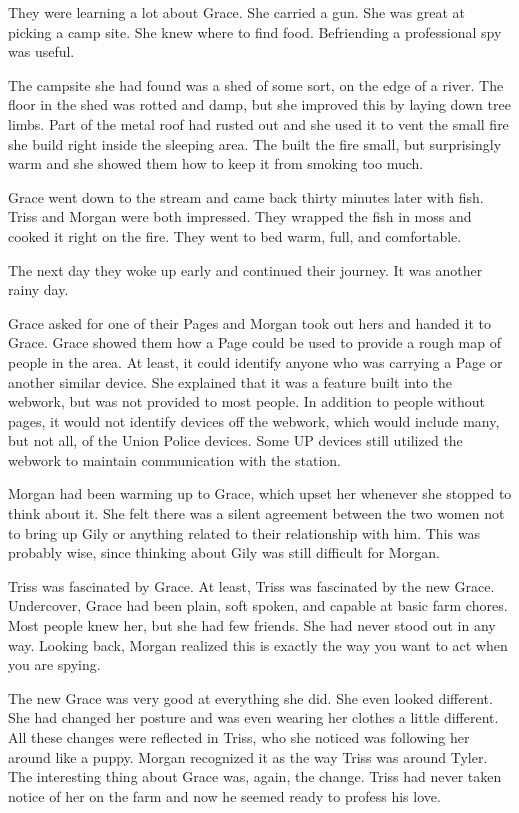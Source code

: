 \documentclass[courier]{sffms}
\begin{document}
They were learning a lot about Grace. She carried
a gun. She was great at picking a camp site. She knew
where to find food. Befriending a professional
spy was useful.

The campsite she had found was a shed of some sort,
on the edge of a river. The floor in the shed was rotted
and damp, but she improved this by laying down
tree limbs. Part of the metal roof had rusted out and
she used it to vent the small fire she build right inside
the sleeping area. The built the fire small, but surprisingly
warm and she showed them how to keep it from smoking
too much.

Grace went down to the stream and came back thirty
minutes later with fish. Triss and Morgan were both
impressed. They wrapped the fish in moss and cooked
it right on the fire. They went to bed warm, full, and
comfortable.

The next day they woke up early and continued their
journey. It was another rainy day.

Grace asked for one of their Pages and Morgan took
out hers and handed it to Grace. Grace showed them
how a Page could be used to provide a rough map of
people in the area. At least, it could identify anyone
who was carrying a Page or another similar device.
She explained that it was a feature built into the
webwork, but was not provided to most people. In
addition to people without pages, it would not identify
devices off the webwork, which would include many,
but not all, of the Union Police devices. Some UP devices
still utilized the webwork to maintain communication
with the station.

Morgan had been warming up to Grace, which upset
her whenever she stopped to think about it. She felt
there was a silent agreement between the two women
not to bring up Gily or anything related to their relationship
with him. This was probably wise, since thinking about
Gily was still difficult for Morgan.

Triss was fascinated by Grace. At least, Triss was
fascinated by the new Grace. Undercover, Grace had
been plain, soft spoken, and capable at basic farm
chores. Most people knew her, but she had few friends.
She had never stood out in any way. Looking back,
Morgan realized this is exactly the way you want to
act when you are spying.

The new Grace was very good at everything she did.
She even looked different. She had changed her posture
and was even wearing her clothes a little different.
All these changes were reflected in Triss, who she
noticed was following her around like a puppy. Morgan
recognized it as the way Triss was around Tyler. The
interesting thing about Grace was, again, the change.
Triss had never taken notice of her on the farm and now
he seemed ready to profess his love.
\end{document}
